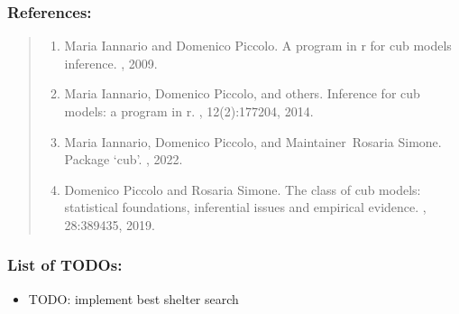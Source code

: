 \documentclass[letterpaper,10pt,english]{sphinxmanual}
\begin{document}
\subsubsection{References:}
\label{\detokenize{cubmods:id636}}\begin{quote}
\begin{enumerate}
%
\setcounter{enumi}{0}
\item {} 
\sphinxAtStartPar
Maria Iannario and Domenico Piccolo. A program in r for cub models inference. , 2009.

\item {} 
\sphinxAtStartPar
Maria Iannario, Domenico Piccolo, and others. Inference for cub models: a program in r. , 12(2):177\textendash{}204, 2014.

\item {} 
\sphinxAtStartPar
Maria Iannario, Domenico Piccolo, and Maintainer Rosaria Simone. Package ‘cub’. , 2022.

\item {} 
\sphinxAtStartPar
Domenico Piccolo and Rosaria Simone. The class of cub models: statistical foundations, inferential issues and empirical evidence. , 28:389\textendash{}435, 2019.

\end{enumerate}
\end{quote}


\subsubsection{List of TODOs:}
\label{\detokenize{cubmods:id674}}\begin{itemize}
\item {} 
\sphinxAtStartPar
TODO: implement best shelter search

\end{itemize}
\end{document}
